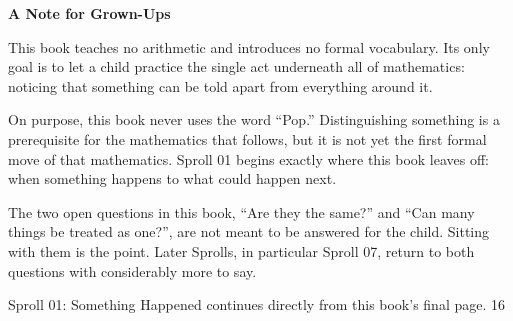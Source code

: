 \documentclass[12pt]{book}
\newcommand{\pagenum}[1]{\vfill{\color{gray!50}\footnotesize #1}}
\newcommand{\sprollpage}{\newpage\vspace*{0.4in}}
\begin{document}
\sprollpage
\vspace*{0.3in}
{\large \textbf{A Note for Grown-Ups}}
\vspace{0.2in}

\normalsize
This book teaches no arithmetic and introduces no formal vocabulary. Its only goal is to let a child practice the single act underneath all of mathematics: noticing that something can be told apart from everything around it.

\vspace{0.15in}
On purpose, this book never uses the word ``Pop.'' Distinguishing something is a prerequisite for the mathematics that follows, but it is not yet the first formal move of that mathematics. Sproll 01 begins exactly where this book leaves off: when something happens to what could happen next.

\vspace{0.15in}
The two open questions in this book, ``Are they the same?'' and ``Can many things be treated as one?'', are not meant to be answered for the child. Sitting with them is the point. Later Sprolls, in particular Sproll 07, return to both questions with considerably more to say.

\vspace{0.3in}
{\small Sproll 01: Something Happened continues directly from this book's final page.}
\pagenum{16}
\end{document}
